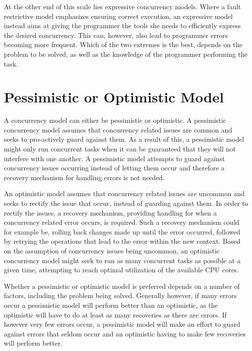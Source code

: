 At the other end of this scale lies expressive concurrency models. Where a fault restrictive model emphasizes ensuring correct execution, an expressive model instead aims at giving the programmer the tools she needs to efficiently express the desired concurrency. This can, however, also lead to programmer errors becoming more frequent. Which of the two extremes is the best, depends on the problem to be solved, as well as the knowledge of the programmer performing the task.
 
\section{Pessimistic or Optimistic Model}
A concurrency model can either be pessimistic or optimistic. A pessimistic concurrency model assumes that concurrency related issues are common and seeks to pro-actively guard against them\cite[p. 170]{weikum2001transactional}. As a result of this, a pessimistic model might only run concurrent tasks when it can be guaranteed that they will not interfere with one another. A pessimistic model attempts to guard against concurrency issues occurring instead of letting them occur and therefore a recovery mechanism for handling errors is not needed.

An optimistic model assumes that concurrency related issues are uncommon and seeks to rectify the issue that occur, instead of guarding against them\cite[p. 170]{weikum2001transactional}. In order to rectify the issues, a recovery mechanism, providing handling for when a concurrency related error occurs, is required. Such a recovery mechanism could for example be, rolling back changes made up until the error occurred, followed by retrying the operations that lead to the error within the new context. Based on the assumption of concurrency issues being uncommon, an optimistic concurrency model might seek to run as many concurrent tasks as possible at a given time, attempting to reach optimal utilization of the available \ac{CPU} cores.

Whether a pessimistic or optimistic model is preferred depends on a number of factors, including the problem being solved. Generally however, if many errors occur a pessimistic model will perform better than an optimistic, as the optimistic will have to do at least as many recoveries as there are errors. If however very few errors occur, a pessimistic model will make an effort to guard against errors that seldom occur and an optimistic having to make few recoveries will perform better.

